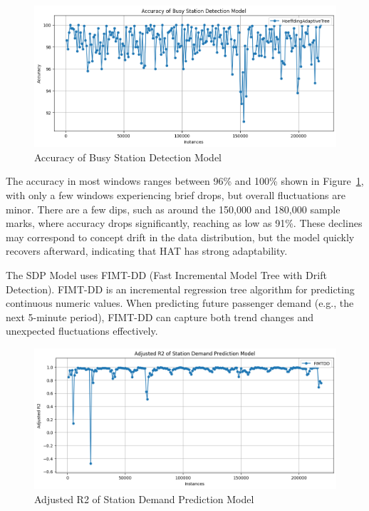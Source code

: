 \documentclass[11pt]{article} %
\begin{document}
\begin{figure}[H]
	\centering
	\caption{Accuracy of Busy Station Detection Model}
	\label{fig:hat_plot}
	\includegraphics[scale=0.55]{hat_plot}
\end{figure}

The accuracy in most windows ranges between 96\% and 100\% shown in Figure~\ref{fig:hat_plot}, with only a few windows experiencing brief drops, but overall fluctuations are minor. There are a few dips, such as around the 150,000 and 180,000 sample marks, where accuracy drops significantly, reaching as low as 91\%. These declines may correspond to concept drift in the data distribution, but the model quickly recovers afterward, indicating that HAT has strong adaptability. 

The SDP Model uses FIMT-DD (Fast Incremental Model Tree with Drift Detection). FIMT-DD is an incremental regression tree algorithm for predicting continuous numeric values. When predicting future passenger demand (e.g., the next 5-minute period), FIMT-DD can capture both trend changes and unexpected fluctuations effectively.

\begin{figure}[H]
	\centering
	\caption{Adjusted R2 of Station Demand Prediction Model}
	\label{fig:r2_plot}
	\includegraphics[scale=0.55]{r2_plot}
\end{figure}
\end{document}
